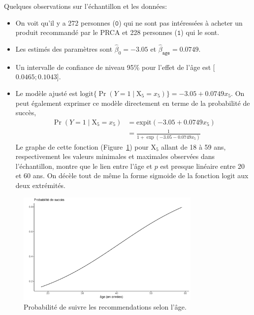 \documentclass[
  11pt,
  letterpaper,
]{scrbook}
\providecommand{\tightlist}{%
  \setlength{\itemsep}{0pt}\setlength{\parskip}{0pt}}\usepackage{longtable,booktabs,array}
\theoremstyle{definition}
\theoremstyle{remark}
\begin{document}
Quelques observations sur l'échantillon et les données:

\begin{itemize}
\tightlist
\item
  On voit qu'il y a 272 personnes (\(\texttt{0}\)) qui ne sont pas
  intéressées à acheter un produit recommandé par le PRCA et 228
  personnes (\(\texttt{1}\)) qui le sont.
\item
  Les estimés des paramètres sont \(\widehat{\beta}_0 = -3.05\) et
  \(\widehat{\beta}_{\texttt{age}}=0.0749\).
\item
  Un intervalle de confiance de niveau 95\% pour l'effet de l'âge est
  {[}\(0.0465; 0.1043\){]}.
\item
  Le modèle ajusté est
  \(\textrm{logit}\{\Pr(Y=1 \mid \mathrm{X}_5=x_5)\} = -3.05 + 0.0749 x_5\).
  On peut également exprimer ce modèle directement en terme de la
  probabilité de succès, \begin{align*}
  \Pr(Y=1 \mid \mathrm{X}_5=x_5) &= \textrm{expit}(-3.05 + 0.0749 x_5) \\&= \frac{1}{1+\exp(-3.05 - 0.0749 x_5)}
  \end{align*} Le graphe de cette fonction (Figure~\ref{fig-logitplot2})
  pour \(\mathrm{X}_5\) allant de 18 à 59 ans, respectivement les
  valeurs minimales et maximales observées dans l'échantillon, montre
  que le lien entre l'âge et \(p\) est presque linéaire entre 20 et 60
  ans. On décèle tout de même la forme sigmoide de la fonction
  \(\textrm{logit}\) aux deux extrémités.
\end{itemize}

\begin{figure}[ht!]

{\centering \includegraphics[width=0.8\textwidth,height=\textheight]{reglogistique_files/figure-pdf/fig-logitplot2-1.pdf}

}

\caption{\label{fig-logitplot2}Probabilité de suivre les recommendations
selon l'âge.}

\end{figure}
\end{document}
